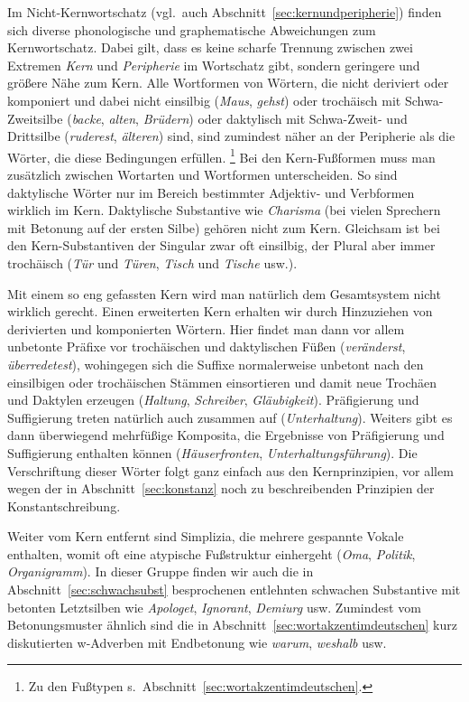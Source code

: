 Im Nicht-Kernwortschatz (vgl.\ auch Abschnitt~\ref{sec:kernundperipherie}) finden sich diverse phonologische und graphematische Abweichungen zum Kernwortschatz.
Dabei gilt, dass es keine scharfe Trennung zwischen zwei Extremen \textit{Kern} und \textit{Peripherie} im Wortschatz gibt, sondern geringere und größere Nähe zum Kern.
Alle Wortformen von Wörtern, die nicht deriviert oder komponiert und dabei nicht einsilbig (\textit{Maus}, \textit{gehst}) oder trochäisch mit Schwa-Zweitsilbe (\textit{backe}, \textit{alten}, \textit{Brüdern}) oder daktylisch mit Schwa-Zweit- und Drittsilbe (\textit{ruderest}, \textit{älteren}) sind, sind zumindest näher an der Peripherie als die Wörter, die diese Bedingungen erfüllen.%
\footnote{Zu den Fußtypen s.\ Abschnitt~\ref{sec:wortakzentimdeutschen}.}
Bei den Kern-Fußformen muss man zusätzlich zwischen Wortarten und Wortformen unterscheiden.
So sind \zB daktylische Wörter nur im Bereich bestimmter Adjektiv- und Verbformen wirklich im Kern.
Daktylische Substantive wie \textit{Charisma} \textipa{[ka.KIs.ma]} (bei vielen Sprechern mit Betonung auf der ersten Silbe) gehören nicht zum Kern.
Gleichsam ist bei den Kern-Substantiven der Singular zwar oft einsilbig, der Plural aber immer trochäisch (\textit{Tür} und \textit{Türen}, \textit{Tisch} und \textit{Tische} usw.).


Mit einem so eng gefassten Kern wird man natürlich dem Gesamtsystem nicht wirklich gerecht.
Einen erweiterten Kern erhalten wir durch Hinzuziehen von derivierten und komponierten Wörtern.
Hier findet man dann vor allem unbetonte Präfixe vor trochäischen und daktylischen Füßen (\textit{veränderst}, \textit{überredetest}), wohingegen sich die Suffixe normalerweise unbetont nach den einsilbigen oder trochäischen Stämmen einsortieren und damit neue Trochäen und Daktylen erzeugen (\textit{Haltung}, \textit{Schreiber}, \textit{Gläubigkeit}).
Präfigierung und Suffigierung treten natürlich auch zusammen auf (\textit{Unterhaltung}).
Weiters gibt es dann überwiegend mehrfüßige Komposita, die Ergebnisse von Präfigierung und Suffigierung enthalten können (\textit{Häuserfronten}, \textit{Unterhaltungsführung}).
Die Verschriftung dieser Wörter folgt ganz einfach aus den Kernprinzipien, vor allem wegen der in Abschnitt~\ref{sec:konstanz} noch zu beschreibenden Prinzipien der Konstantschreibung.

Weiter vom Kern entfernt sind Simplizia, die mehrere gespannte Vokale enthalten, womit oft eine atypische Fußstruktur einhergeht (\textit{Oma}, \textit{Politik}, \textit{Organigramm}).
In dieser Gruppe finden wir auch die in Abschnitt~\ref{sec:schwachsubst} besprochenen entlehnten schwachen Substantive mit betonten Letztsilben wie \textit{Apologet}, \textit{Ignorant}, \textit{Demiurg} usw.
Zumindest vom Betonungsmuster ähnlich sind die in Abschnitt~\ref{sec:wortakzentimdeutschen} kurz diskutierten w-Adverben mit Endbetonung wie \textit{warum}, \textit{weshalb} usw.

